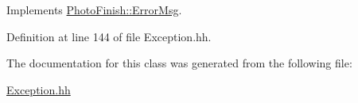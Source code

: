 Implements \hyperlink{class_photo_finish_1_1_error_msg_ae84614a0c68520a7ad11e699c1504e82}{Photo\+Finish\+::\+Error\+Msg}.



Definition at line 144 of file Exception.\+hh.



The documentation for this class was generated from the following file\+:\begin{DoxyCompactItemize}
\item 
\hyperlink{_exception_8hh}{Exception.\+hh}\end{DoxyCompactItemize}
